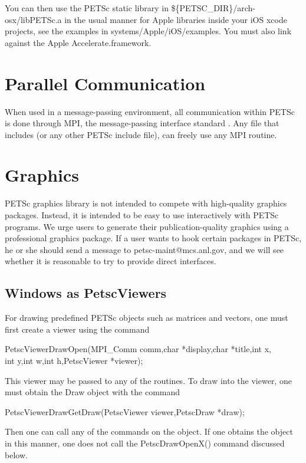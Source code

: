 {{You can then use the PETSc static library in \$\{PETSC\_DIR\}/arch-osx/libPETSc.a in the usual manner for Apple libraries inside your iOS xcode projects, see the examples in systems/Apple/iOS/examples.  You must also link against the Apple Accelerate.framework.

\section{Parallel Communication}

When used in a message-passing environment, all communication 
within
PETSc is done through MPI, the message-passing interface standard
\cite{MPI-final}.  Any file that includes  (or any other
PETSc include file), can freely use any MPI routine.

\section{Graphics}

PETSc graphics library is not intended to compete with
high-quality graphics packages.  Instead, it is intended to be
easy to use interactively with PETSc programs. We urge users
to generate their publication-quality graphics using a
professional graphics package. If a user wants to hook
certain packages in PETSc, he or she should send a message to
petsc-maint@mcs.anl.gov, and we will see whether it is reasonable
to try to provide direct interfaces.

\subsection{Windows as PetscViewers}
For drawing predefined PETSc objects such as matrices and vectors, one must
first create a viewer using the
command
\begin{tabbing}
  PetscViewerDrawOpen(MPI\_Comm comm,char *display,char *title,int x,\\
                       int y,int w,int h,PetscViewer *viewer);
\end{tabbing}
This viewer may be passed to any of the  routines.
To draw into the viewer, one must obtain the Draw object with the
command
\begin{tabbing}
  PetscViewerDrawGetDraw(PetscViewer viewer,PetscDraw *draw);
\end{tabbing}
Then one can call any of the  commands on the 
object. If one obtains the  object in this manner,
one does not call the PetscDrawOpenX() command discussed below.

}}
